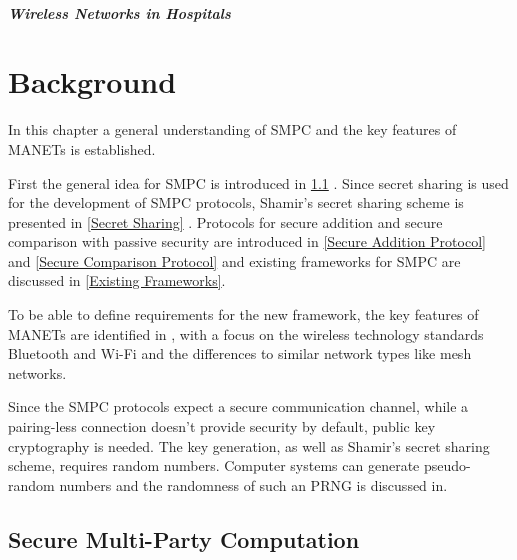 		\paragraph{Wireless Networks in Hospitals}

\chapter{Background} 
\label{Background}
	
	In this chapter a general understanding of \gls{SMPC} and the key features of \gls{MANET}s is established.  
	
	First the general idea for \gls{SMPC} is introduced in \ref{Secure Multi-Party Computation} . Since secret sharing is used for the development of \gls{SMPC} protocols, Shamir's secret sharing scheme is presented in \ref{Secret Sharing} .
	Protocols for secure addition and secure comparison with passive security are introduced in \ref{Secure Addition Protocol} and \ref{Secure Comparison Protocol} and existing frameworks for \gls{SMPC} are discussed in \ref{Existing Frameworks}.
	
	To be able to define requirements for the new framework, the key features of \gls{MANET}s are identified in , with a focus on the wireless technology standards Bluetooth and Wi-Fi and the differences to similar network types like mesh networks.
	
	Since the \gls{SMPC} protocols expect a secure communication channel, while a pairing-less connection doesn't provide security by default, public key cryptography is needed. The key generation, as well as Shamir's secret sharing scheme, requires random numbers. Computer systems can generate pseudo-random numbers and the randomness of such an \gls{PRNG} is discussed in.
		
	\section{Secure Multi-Party Computation}
	\label{Secure Multi-Party Computation}
	
